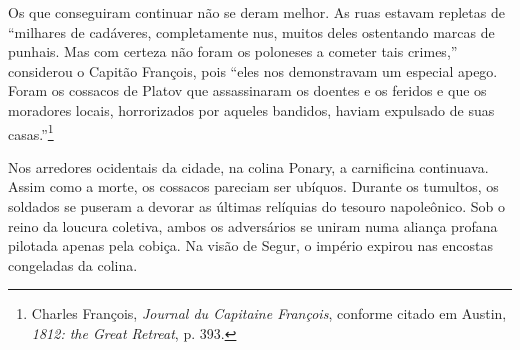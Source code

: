 %

Os que conseguiram continuar não se deram melhor. As ruas estavam
repletas de ``milhares de cadáveres, completamente nus, muitos deles
ostentando marcas de punhais. Mas com certeza não foram os poloneses a
cometer tais crimes,'' considerou o Capitão François, pois ``eles nos
demonstravam um especial apego. Foram os cossacos de Platov que
assassinaram os doentes e os feridos e que os moradores locais,
horrorizados por aqueles bandidos, haviam expulsado de suas
casas.''\footnote{Charles François, \textit{Journal du Capitaine
  François}, conforme citado em Austin, \textit{1812: the Great Retreat},
  p. 393.}

Nos arredores ocidentais da cidade, na colina Ponary, a carnificina
continuava. Assim como a morte, os cossacos pareciam ser ubíquos.
Durante os tumultos, os soldados se puseram a devorar as últimas
relíquias do tesouro napoleônico. Sob o reino da loucura coletiva, ambos
os adversários se uniram numa aliança profana pilotada apenas pela
cobiça. Na visão de Segur, o império expirou nas encostas congeladas da
colina.

